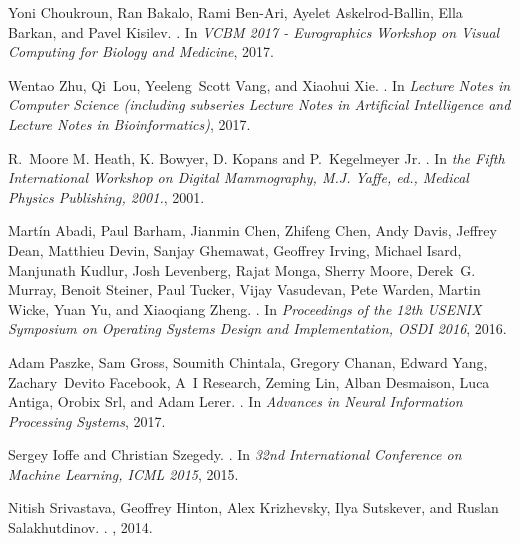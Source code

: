 \documentclass[12pt]{article}
\begin{document}
\begin{thebibliography}{100}
Yoni Choukroun, Ran Bakalo, Rami Ben-Ari, Ayelet Askelrod-Ballin, Ella Barkan,
  and Pavel Kisilev.
.
\newblock In {\em VCBM 2017 - Eurographics Workshop on Visual Computing for
  Biology and Medicine}, 2017.

Wentao Zhu, Qi~Lou, Yeeleng~Scott Vang, and Xiaohui Xie.
.
\newblock In {\em Lecture Notes in Computer Science (including subseries
  Lecture Notes in Artificial Intelligence and Lecture Notes in
  Bioinformatics)}, 2017.

R.~Moore {M. Heath, K. Bowyer, D. Kopans} and P.~Kegelmeyer Jr.
.
\newblock In {\em the Fifth International Workshop on Digital Mammography, M.J.
  Yaffe, ed., Medical Physics Publishing, 2001.}, 2001.

Mart{\'{i}}n Abadi, Paul Barham, Jianmin Chen, Zhifeng Chen, Andy Davis,
  Jeffrey Dean, Matthieu Devin, Sanjay Ghemawat, Geoffrey Irving, Michael
  Isard, Manjunath Kudlur, Josh Levenberg, Rajat Monga, Sherry Moore, Derek~G.
  Murray, Benoit Steiner, Paul Tucker, Vijay Vasudevan, Pete Warden, Martin
  Wicke, Yuan Yu, and Xiaoqiang Zheng.
.
\newblock In {\em Proceedings of the 12th USENIX Symposium on Operating Systems
  Design and Implementation, OSDI 2016}, 2016.

Adam Paszke, Sam Gross, Soumith Chintala, Gregory Chanan, Edward Yang,
  Zachary~Devito Facebook, A~I Research, Zeming Lin, Alban Desmaison, Luca
  Antiga, Orobix Srl, and Adam Lerer.
.
\newblock In {\em Advances in Neural Information Processing Systems}, 2017.

Sergey Ioffe and Christian Szegedy.
.
\newblock In {\em 32nd International Conference on Machine Learning, ICML
  2015}, 2015.

Nitish Srivastava, Geoffrey Hinton, Alex Krizhevsky, Ilya Sutskever, and Ruslan
  Salakhutdinov.
.
, 2014.


\end{thebibliography}
\end{document}

